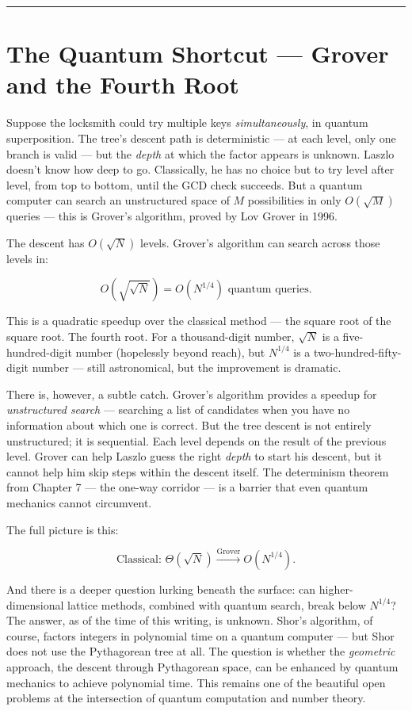 \bigskip\noindent\rule{\linewidth}{0.4pt}\bigskip

\section{The Quantum Shortcut --- Grover and the Fourth Root}
Suppose the locksmith could try multiple keys \emph{simultaneously}, in quantum superposition. The tree's descent path is deterministic --- at each level, only one branch is valid --- but the \emph{depth} at which the factor appears is unknown. Laszlo doesn't know how deep to go. Classically, he has no choice but to try level after level, from top to bottom, until the GCD check succeeds. But a quantum computer can search an unstructured space of \(M\) possibilities in only \(O(\sqrt{M})\) queries --- this is Grover's algorithm, proved by Lov Grover in 1996.

The descent has \(O(\sqrt{N})\) levels. Grover's algorithm can search across those levels in:

\[O\!\left(\sqrt{\sqrt{N}}\right) = O\!\left(N^{1/4}\right) \text{ quantum queries.}\]

This is a quadratic speedup over the classical method --- the square root of the square root. The fourth root. For a thousand-digit number, \(\sqrt{N}\) is a five-hundred-digit number (hopelessly beyond reach), but \(N^{1/4}\) is a two-hundred-fifty-digit number --- still astronomical, but the improvement is dramatic.

There is, however, a subtle catch. Grover's algorithm provides a speedup for \emph{unstructured search} --- searching a list of candidates when you have no information about which one is correct. But the tree descent is not entirely unstructured; it is sequential. Each level depends on the result of the previous level. Grover can help Laszlo guess the right \emph{depth} to start his descent, but it cannot help him skip steps within the descent itself. The determinism theorem from Chapter 7 --- the one-way corridor --- is a barrier that even quantum mechanics cannot circumvent.

The full picture is this:

\[\text{Classical: } \Theta(\sqrt{N}) \xrightarrow{\text{Grover}} O(N^{1/4}).\]

And there is a deeper question lurking beneath the surface: can higher-dimensional lattice methods, combined with quantum search, break below \(N^{1/4}\)? The answer, as of the time of this writing, is unknown. Shor's algorithm, of course, factors integers in polynomial time on a quantum computer --- but Shor does not use the Pythagorean tree at all. The question is whether the \emph{geometric} approach, the descent through Pythagorean space, can be enhanced by quantum mechanics to achieve polynomial time. This remains one of the beautiful open problems at the intersection of quantum computation and number theory.


